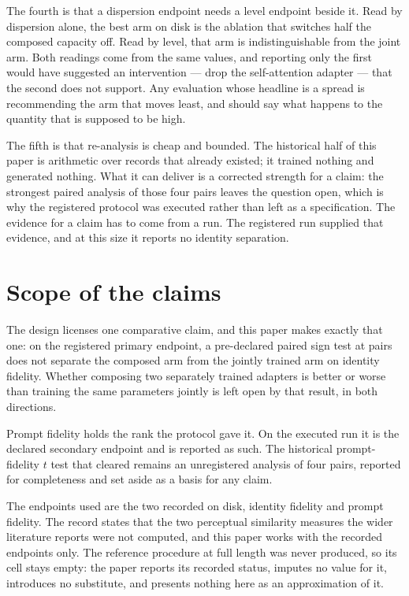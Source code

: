 The fourth is that a dispersion endpoint needs a level endpoint beside it.
Read by dispersion alone, the best arm on disk is the ablation that switches
half the composed capacity off. Read by level, that arm is indistinguishable
from the joint arm. Both readings come from the same values, and reporting
only the first would have suggested an intervention --- drop the
self-attention adapter --- that the second does not support. Any evaluation
whose headline is a spread is recommending the arm that moves least, and
should say what happens to the quantity that is supposed to be high.

The fifth is that re-analysis is cheap and bounded. The historical half of
this paper is arithmetic over records that already existed; it trained nothing
and generated nothing. What it can deliver is a corrected strength for a
claim: the strongest paired analysis of those four pairs leaves the question
open, which is why the registered protocol was executed rather than left as a
specification. The evidence for a claim has to come from a run. The registered
run supplied that evidence, and at this size it reports no identity
separation.

\section{Scope of the claims}

The design licenses one comparative claim, and this paper makes exactly that
one: on the registered primary endpoint, a pre-declared paired sign test at
\RunPairs{} pairs does not separate the composed arm from the jointly trained
arm on identity fidelity. Whether composing two separately trained adapters
is better or worse than training the same parameters jointly is left open by
that result, in both directions.

Prompt fidelity holds the rank the protocol gave it. On the executed run it is
the declared secondary endpoint and is reported as such. The historical
prompt-fidelity $t$ test that cleared \Alpha{} remains an unregistered analysis
of four pairs, reported for completeness and set aside as a basis for any
claim.

The endpoints used are the two recorded on disk, identity fidelity and prompt
fidelity. The record states that the two perceptual similarity measures the
wider literature reports were not computed, and this paper works with the
recorded endpoints only. The reference procedure at full length was never
produced, so its cell stays empty: the paper reports its recorded status,
imputes no value for it, introduces no substitute, and presents nothing here
as an approximation of it.


